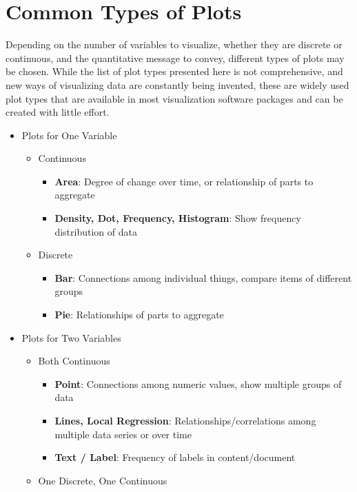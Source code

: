 \section{Common Types of Plots}

Depending on the number of variables to visualize, whether they are discrete or continuous, and the quantitative message to convey, different types of plots may be chosen. While the list of plot types presented here is not comprehensive, and new ways of visualizing data are constantly being invented, these are widely used plot types that are available in most visualization software packages and can be created with little effort.

\begin{itemize}
   \item Plots for One Variable
   \begin{itemize}
      \item Continuous 
      \begin{itemize}
		\item {\bf Area}: Degree of change over time, or relationship of parts to aggregate
		\item {\bf Density, Dot, Frequency, Histogram}: Show frequency distribution of data
	  \end{itemize}
	  \item Discrete
		\begin{itemize}
		  \item {\bf Bar}: Connections among individual things, compare items of different groups
		  \item {\bf Pie}: Relationships of parts to aggregate
		\end{itemize}
    \end{itemize}
    \item Plots for Two Variables
    \begin{itemize}
       \item Both Continuous
			\begin{itemize}
			  \item {\bf Point}: Connections among numeric values, show multiple groups of data
			  \item {\bf Lines, Local Regression}: Relationships/correlations among multiple data series or over time
			  \item {\bf Text / Label}: Frequency of labels in content/document
			\end{itemize}
	   \item One Discrete, One Continuous
			\begin{itemize}

\end{itemize}
\end{itemize}
\end{itemize}
